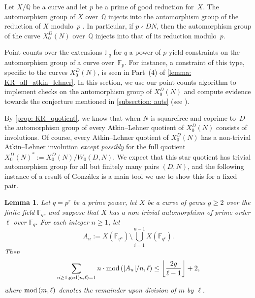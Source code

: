\documentclass[11pt,reqno]{amsart}
\newcommand{\F}{\mathbb{F}}
\newcommand{\Q}{\mathbb{Q}}
\newtheorem{lemma}[theorem]{Lemma}
\theoremstyle{definition}
\newcommand{\Pietro}[1]{{\color{orange}{??Pietro: #1}}} %
\begin{document}
Let $X/\Q$ be a curve and let $p$ be a prime of good reduction for~$X$. The automorphism group of $X$ over~$\Q$ injects into the automorphism group of the reduction of $X$ modulo~$p$ \cite[Proposition~3.38, Chapter~10]{Liu}. In particular, if $p \nmid DN$, then the automorphism group of the curve $X_0^D(N)$ over~$\Q$ injects into that of its reduction modulo~$p$.

Point counts over the extensions $\F_q$ for $q$ a power of $p$ yield constraints on the automorphism group of a curve over~$\F_p$. For instance, a constraint of this type, specific to the curves $X_0^D(N)$, is seen in Part~(4) of \cref{lemma: KR_all_atkin_lehner}. In this section, we use our point counts algorithm to implement checks on the automorphism group of $X_0^D(N)$ and compute evidence towards the conjecture mentioned in \cref{subsection: auts} (see ).

By \cref{prop: KR_quotient}, we know that when $N$ is squarefree and coprime to~$D$ the automorphism group of every Atkin--Lehner quotient of $X_0^D(N)$ %
consists of involutions. Of course, every Atkin--Lehner quotient of $X_0^D(N)$ has a non-trivial Atkin--Lehner involution \emph{except possibly} for the full quotient $X_0^D(N)^* := X_0^D(N)/W_0(D,N)$. We expect that this star quotient has trivial automorphism group for all but finitely many pairs $(D,N)$, and the following instance of a result of Gonz\'{a}lez is a main tool we use to show this for a fixed pair.

\begin{lemma}\cite[Equation (2.2)]{Gonzalez17}\label{lemma: Gonzalez_no_involutions}
Let $q = p^r$ be a prime power, let $X$ be a curve of genus $g \geq 2$ over the finite field $\F_q$, and suppose that $X$ has a non-trivial automorphism of prime order $\ell$ over $\F_q$. For each integer $n \geq 1$, let 
\[ A_n := X(\F_{q^n}) \setminus \displaystyle\bigcup_{i=1}^{n-1} X(\F_{q^i}). \] 
Then 
\[ \sum_{n \geq 1, \gcd(n,\ell) = 1} n\cdot \textnormal{mod}\left(|A_n|/n,\ell\right) \leq \left\lfloor \dfrac{2g}{\ell-1} \right\rfloor + 2, \]
where $\textnormal{mod}\left(m,\ell\right)$ denotes the remainder upon division of $m$ by $\ell$. 
\end{lemma}
\end{document}
